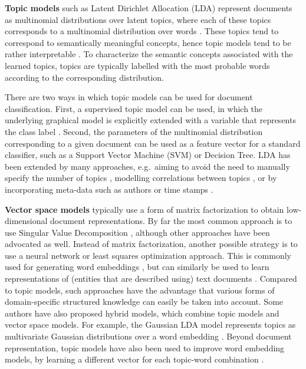 \textbf{Topic models} such as Latent Dirichlet Allocation (LDA) represent documents as multinomial distributions over latent topics, where each of these topics corresponds to a multinomial distribution over words \cite{Blei2003}. These topics tend to correspond to semantically meaningful concepts, hence topic models tend to be rather interpretable \cite{Chang2009}. To characterize the semantic concepts associated with the learned topics, topics are typically labelled with the most probable words according to the corresponding distribution. 

There are two ways in which topic models can be used for document classification. First, a supervised topic model can be used, in which the underlying graphical model is explicitly extended with a variable that represents the class label \cite{Blei2010}. Second, the parameters of the multinomial distribution corresponding to a given document can be used as a feature vector for a standard classifier, such as a Support Vector Machine (SVM) or Decision Tree. LDA has been extended by many approaches, e.g.\ aiming to avoid the need to manually specify the number of topics \cite{teh2005sharing}, modelling correlations between topics \cite{Blei2006}, or by incorporating meta-data such as authors \cite{rosen2004author} or time stamps \cite{wang2006topics}.

\textbf{Vector space models} typically use a form of matrix factorization to obtain low-dimensional document representations. By far the most common approach is to use Singular Value Decomposition \cite{ASI:ASI1}, although other approaches have been advocated as well. 
Instead of matrix factorization, another possible strategy is to use a neural network or least squares optimization approach. This is commonly used for generating word embeddings \cite{DBLP:conf/nips/MikolovSCCD13,glove2014}, but can similarly be used to learn representations of (entities that are described using) text documents \cite{DBLP:journals/corr/DaiOL15,van2016learning,DBLP:conf/sigir/JameelBS17}. Compared to topic models, such approaches have the advantage that various forms of domain-specific structured knowledge can easily be taken into account. Some authors have also proposed hybrid models, which combine topic models and vector space models. For example, the Gaussian LDA model represents topics as multivariate Gaussian distributions over a word embedding \cite{DBLP:conf/acl/DasZD15}. Beyond document representation, topic models have also been used to improve word embedding models, by learning a different vector for each topic-word combination \cite{DBLP:conf/aaai/LiuLCS15}.


